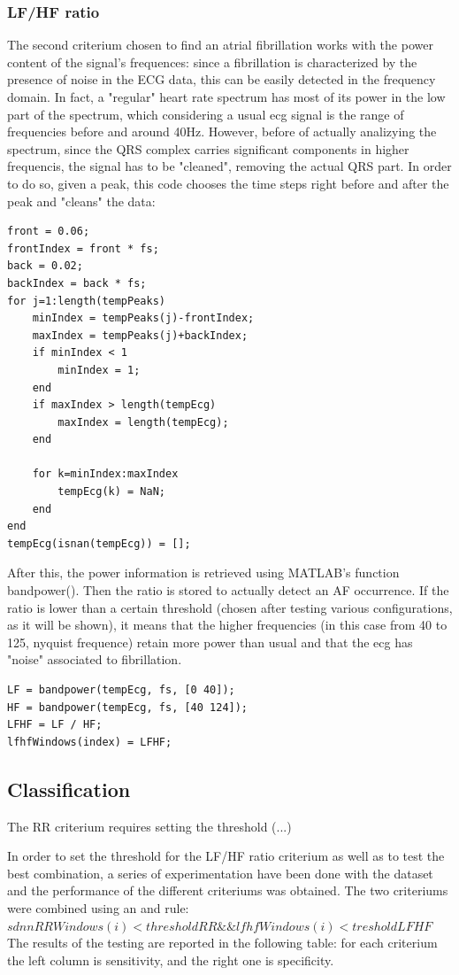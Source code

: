 \documentclass[a4paper,titlepage]{article}
\begin{document}
\subsubsection{LF/HF ratio}
The second criterium chosen to find an atrial fibrillation works with the power content of the signal's frequences: since a fibrillation is characterized by the presence of noise in the ECG data, this can be easily detected in the frequency domain.
In fact, a "regular" heart rate spectrum has most of its power in the low part of the spectrum, which considering a usual ecg signal is the range of frequencies  before and around 40Hz.
However, before of actually analizying the spectrum, since the QRS complex carries significant components in higher frequencis, the signal has to be "cleaned", removing the actual QRS part.
In order to do so, given a peak, this code chooses the time steps right before and after the peak and "cleans" the data:

\begin{lstlisting}
front = 0.06;
frontIndex = front * fs;
back = 0.02;
backIndex = back * fs;
for j=1:length(tempPeaks)
	minIndex = tempPeaks(j)-frontIndex;
	maxIndex = tempPeaks(j)+backIndex;
	if minIndex < 1
		minIndex = 1;
	end
	if maxIndex > length(tempEcg)
		maxIndex = length(tempEcg);
	end

	for k=minIndex:maxIndex
		tempEcg(k) = NaN;
	end
end
tempEcg(isnan(tempEcg)) = [];
\end{lstlisting}

After this, the power information is retrieved using MATLAB's function bandpower(). Then the ratio is stored to actually detect an AF occurrence. If the ratio is lower than a certain threshold (chosen after testing various configurations, as it will be shown), it means that the higher frequencies (in this case from 40 to 125, nyquist frequence) retain more power than usual and that the ecg has "noise" associated to fibrillation.

\begin{lstlisting}
LF = bandpower(tempEcg, fs, [0 40]);
HF = bandpower(tempEcg, fs, [40 124]);
LFHF = LF / HF;
lfhfWindows(index) = LFHF;
\end{lstlisting}


\subsection{Classification}
The RR criterium requires setting the threshold (...)

In order to set the threshold for the LF/HF ratio criterium as well as to test the best combination, a series of experimentation have been done with the dataset and the performance of the different criteriums was obtained.
The two criteriums were combined using an and rule:
\\$sdnnRRWindows(i) < thresholdRR \&\& lfhfWindows(i) < tresholdLFHF$\\
The results of the testing are reported in the following table: for each criterium the left column is sensitivity, and the right one is specificity.
\end{document}
